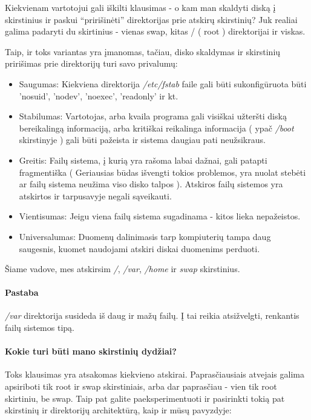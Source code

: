 Kiekvienam vartotojui gali iškilti klausimas - o kam man skaldyti
diską į skirstinius ir paskui ``pririšinėti'' direktorijas prie
atskirų skirstinių? Juk realiai galima padaryti du skirtinius - vienas
swap, kitas / ( root ) direktorijai ir viskas.

Taip, ir toks variantas yra įmanomas, tačiau, disko skaldymas ir
skirstinių pririšimas prie direktorijų turi savo privalumų:

\begin{itemize}
  \item Saugumas: Kiekviena direktorija \textsl{/etc/fstab} faile gali
    būti sukonfigūruota būti 'nosuid', 'nodev', 'noexec', 'readonly'
    ir kt.
  \item Stabilumas: Vartotojas, arba kvaila programa gali visiškai
    užteršti diską bereikalingą informaciją, arba kritiškai reikalinga
    informacija ( ypač \textsl{/boot} skirstinyje ) gali būti pažeista
    ir sistema daugiau pati neužsikraus. 
  \item Greitis: Failų sistema, į kurią yra rašoma labai dažnai, gali
    patapti fragmentiška ( Geriausias būdas išvengti tokios problemos,
    yra nuolat stebėti ar failų sistema neužima viso disko talpos
    ). Atskiros failų sistemos yra atskirtos ir tarpusavyje negali
    sąveikauti.
  \item Vientisumas: Jeigu viena failų sistema sugadinama - kitos
    lieka nepažeistos.
  \item Universalumas: Duomenų dalinimasis tarp kompiuterių tampa daug
    saugesnis, kuomet naudojami atskiri diskai duomenims perduoti. 
\end{itemize}

Šiame vadove, mes atskirsim \textsl{/}, \textsl{/var}, \textsl{/home}
ir \textsl{swap} skirstinius.

\paragraph{Pastaba} \textsl{/var} direktorija susideda iš daug ir mažų
failų. Į tai reikia atsižvelgti, renkantis failų sistemos tipą.

\paragraph{Kokie turi būti mano skirstinių dydžiai?}

Toks klausimas yra atsakomas kiekvieno atskirai. Paprasčiausiais
atvejais galima apsiriboti tik root ir swap skirstiniais, arba dar
paprasčiau - vien tik root skirtiniu, be swap. Taip pat galite
paeksperimentuoti ir pasirinkti tokią pat skirstinių ir direktorijų
architektūrą, kaip ir mūsų pavyzdyje:


